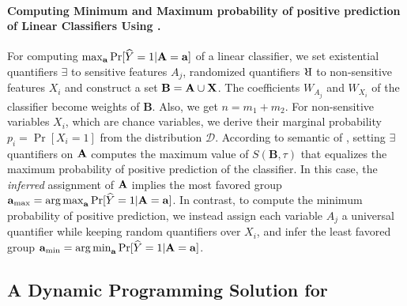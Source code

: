 \paragraph{Computing Minimum and Maximum probability of positive prediction of Linear Classifiers Using  {\stochastic}.} For computing $ \max_{ \mathbf{a}} \Pr[\widehat{Y} =1 | \mathbf{A} = \mathbf{a}] $ of a linear classifier, we set existential quantifiers $ \exists $ to sensitive features $ A_j $, randomized quantifiers $ \R $ to non-sensitive features $ X_i $ and construct a set $ \mathbf{B} = \mathbf{A} \cup \mathbf{X} $.  The coefficients $ W_{A_j} $ and $ W_{X_i} $ of the classifier become weights of $ \mathbf{B} $. Also, we get $n=m_1 +m_2$. For non-sensitive variables $ X_i $, which are chance variables, we derive their marginal probability $ p_i = \Pr[X_i = 1] $ from the distribution $ \mathcal{D} $.  According to semantic of {\stochastic}, setting $ \exists $ quantifiers on $ \mathbf{A} $ computes the maximum value of $ S(\mathbf{B}, \tau) $ that equalizes the maximum probability of positive prediction of the classifier. In this case, the \textit{inferred} assignment of $ \mathbf{A} $ implies the most favored group $ \mathbf{a}_{{\max}} =  \operatorname*{arg\,max}_{ \mathbf{a}} \Pr[\widehat{Y} =1 | \mathbf{A} = \mathbf{a}] $. In contrast, to compute the minimum probability of positive prediction, we instead assign each variable  $ A_j $ a universal  quantifier  while keeping random quantifiers over $ X_i $, and infer the least favored group $ \mathbf{a}_{{\min}} =  \operatorname*{arg\,min}_{ \mathbf{a}} \Pr[\widehat{Y} =1 | \mathbf{A} = \mathbf{a}] $.

\iffalse
\red{The decision version of computing the maximum (minimum) \red{\red{probability of positive prediction}} is to decide whether there is an assignment of \textit{sensitive} or \textit{choice variables}, for which the \textit{non-sensitive} or \textit{chance variables} yield a \red{\red{probability of positive prediction}} greater or less than $\alpha \in [0,1]$. Now, we formally state the hardness of verifying linear classifiers followed by an efficient dynamic programming solution.
\begin{lemma}
	\label{fvgm_lm:hardness}
	The decision version of the fairness verification problem for linear classifiers is in $\mathrm{NP^{PP}}$.
\end{lemma}}
\fi

 
 
 \subsection{A Dynamic Programming Solution for {\stochastic}}
 \label{fvgm_sec:dp_formulation}

